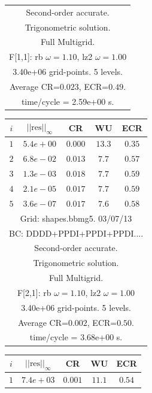 \begin{table}[hbt]
\begin{center}
{\begin{tabular}{|c|c|c|c|c|}
\multicolumn{5}{|c|}{Second-order accurate.}  \\
\multicolumn{5}{|c|}{Trigonometric solution.}  \\
\multicolumn{5}{|c|}{Full Multigrid.}  \\
\multicolumn{5}{|c|}{F[1,1]: rb $\omega=1.10$, lz2 $\omega=1.00$}  \\
\multicolumn{5}{|c|}{3.40e+06 grid-points. 5 levels.}  \\
\multicolumn{5}{|c|}{Average CR=$0.023$, ECR=$0.49$.}  \\
\multicolumn{5}{|c|}{time/cycle = 2.59e+00 s.}  \\
\hline 
\end{tabular}
\begin{tabular}{|c|c|c|c|c|} \hline 
 $i$   & $\vert\vert\mbox{res}\vert\vert_\infty$  &  CR     &  WU    & ECR  \\   \hline 
 $ 1$  & $ 5.4e+00$ & $0.000$ & $13.3$ & $0.35$ \\ 
 $ 2$  & $ 6.8e-02$ & $0.013$ & $ 7.7$ & $0.57$ \\ 
 $ 3$  & $ 1.3e-03$ & $0.018$ & $ 7.7$ & $0.59$ \\ 
 $ 4$  & $ 2.1e-05$ & $0.017$ & $ 7.7$ & $0.59$ \\ 
 $ 5$  & $ 3.6e-07$ & $0.017$ & $ 7.6$ & $0.58$ \\ 
\hline 
\multicolumn{5}{|c|}{Grid: shapes.bbmg5. 03/07/13}  \\
\multicolumn{5}{|c|}{BC: DDDD+PPDI+PPDI+PPDI....}  \\
\multicolumn{5}{|c|}{Second-order accurate.}  \\
\multicolumn{5}{|c|}{Trigonometric solution.}  \\
\multicolumn{5}{|c|}{Full Multigrid.}  \\
\multicolumn{5}{|c|}{F[2,1]: rb $\omega=1.10$, lz2 $\omega=1.00$}  \\
\multicolumn{5}{|c|}{3.40e+06 grid-points. 5 levels.}  \\
\multicolumn{5}{|c|}{Average CR=$0.002$, ECR=$0.50$.}  \\
\multicolumn{5}{|c|}{time/cycle = 3.68e+00 s.}  \\
\hline 
\end{tabular}
\begin{tabular}{|c|c|c|c|c|} \hline 
 $i$   & $\vert\vert\mbox{res}\vert\vert_\infty$  &  CR     &  WU    & ECR  \\   \hline 
 $ 1$  & $ 7.4e+03$ & $0.001$ & $11.1$ & $0.54$ \\ 

\end{tabular}}
\end{center}
\end{table}
